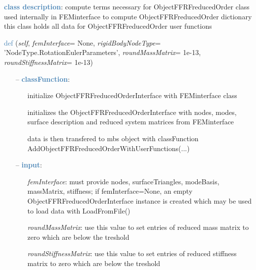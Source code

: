 \begin{itemize}[leftmargin=1.4cm]
\begin{itemize}[leftmargin=1.4cm]
\begin{itemize}[leftmargin=1.4cm]
\begin{itemize}[leftmargin=0.5cm]
\begin{itemize}[leftmargin=1.4cm]
\begin{itemize}[leftmargin=1.4cm]
\begin{itemize}[leftmargin=0.5cm]
%
\noindent\textcolor{steelblue}{{\bf class description}}:  compute terms necessary for ObjectFFRFreducedOrder
  class used internally in FEMinterface to compute ObjectFFRFreducedOrder dictionary
  this class holds all data for ObjectFFRFreducedOrder user functions
\vspace{3pt} \\ 
\begin{flushleft}
\noindent \textcolor{steelblue}{def {\bf {}}}\label{sec:FEM:ObjectFFRFreducedOrderInterface:__init__}
({\it self}, {\it femInterface}= None, {\it rigidBodyNodeType}= 'NodeType.RotationEulerParameters', {\it roundMassMatrix}= 1e-13, {\it roundStiffnessMatrix}= 1e-13)
\end{flushleft}
\setlength{\itemindent}{0.7cm}
\begin{itemize}[leftmargin=0.7cm]
\item[--]\textcolor{steelblue}{\bf classFunction}: \vspace{-6pt}
\begin{itemize}[leftmargin=1.2cm]
\setlength{\itemindent}{-0.7cm}
\item[]initialize ObjectFFRFreducedOrderInterface with FEMinterface class
\item[]initializes the ObjectFFRFreducedOrderInterface with nodes, modes, surface description and reduced system matrices from FEMinterface
\item[]data is then transfered to mbs object with classFunction AddObjectFFRFreducedOrderWithUserFunctions(...)
\end{itemize}
\item[--]\textcolor{steelblue}{\bf input}: \vspace{-6pt}
\begin{itemize}[leftmargin=1.2cm]
\setlength{\itemindent}{-0.7cm}
\item[]{\it femInterface}: must provide nodes, surfaceTriangles, modeBasis, massMatrix, stiffness; if femInterface=None, an empty ObjectFFRFreducedOrderInterface instance is created which may be used to load data with LoadFromFile()
\item[]{\it roundMassMatrix}: use this value to set entries of reduced mass matrix to zero which are below the treshold
\item[]{\it roundStiffnessMatrix}: use this value to set entries of reduced stiffness matrix to zero which are below the treshold

\end{itemize}
\end{itemize}
\end{itemize}
\end{itemize}
\end{itemize}
\end{itemize}
\end{itemize}
\end{itemize}
\end{itemize}
